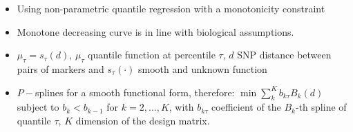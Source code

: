 \documentclass[a0paper,portrait]{baposter}
\begin{document}
\begin{poster}
 {%
\begin{itemize}[leftmargin=*]
	\item Using non-parametric quantile 
	regression with a monotonicity constraint \citep{Muggeo2013,BollaertsEtAl2006StatMod}
	\item Monotone decreasing curve is in line with biological assumptions.
	\item $\mu_{\tau}=s_{\tau}(d)$, $\mu_\tau$ quantile function at 
	percentile $\tau$, $d$ SNP distance between pairs of markers and 
	$s_{\tau}(\cdot)$ smooth and unknown function
	\item  $P-$splines for a smooth functional form, therefore: \newline
	$\min\sum_k^K b_{k\tau} B_k(d)$ subject to $b_k<b_{k-1}$ for $k=2,\ldots,K$, with $b_{k\tau}$
	coefficient of the $B_k$-th spline of quantile $\tau$, $K$ dimension of the design matrix.
	\newline $\mbox{}$
%	
%
\end{itemize}
}



\end{poster}
\end{document}

